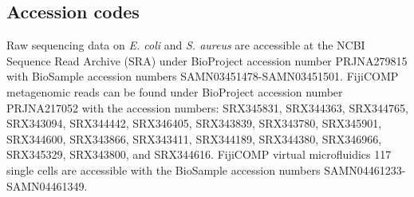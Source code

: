 \subsection{Accession codes}
Raw sequencing data on \textit{E. coli} and \textit{S. aureus} are accessible at the NCBI Sequence Read Archive (SRA) under BioProject accession number PRJNA279815 with BioSample accession numbers SAMN03451478-SAMN03451501. FijiCOMP metagenomic reads can be found under BioProject accession number PRJNA217052 with the accession numbers: SRX345831, SRX344363, SRX344765, SRX343094, SRX344442, SRX346405, SRX343839, SRX343780, SRX345901, SRX344600, SRX343866, SRX343411, SRX344189, SRX344380, SRX346966, SRX345329, SRX343800, and SRX344616. FijiCOMP virtual microfluidics 117 single cells are accessible with the BioSample accession numbers SAMN04461233-SAMN04461349.



